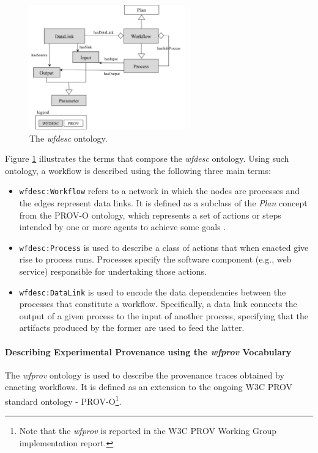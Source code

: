 \begin{figure}[ht]
  \centering
  \includegraphics[width=0.6\textwidth]{Figures/wfdesc.png}
  \caption{The \textit{wfdesc} ontology.}
  \label{fig:wfdesc}
\end{figure}

Figure \ref{fig:wfdesc} illustrates the terms that compose the \textit{wfdesc} ontology. Using such ontology, a workflow is described using the following three main terms:
\begin{itemize}
\item
\texttt{wfdesc:Workflow} refers to a network in which the nodes are processes and the edges represent data links. It is defined as a subclass of the \textit{Plan} concept from the PROV-O ontology, which represents a set of actions or steps intended by one or more agents to achieve some goals \cite{w3c-prov-o}. 
\item
\texttt{wfdesc:Process} is used to describe a class of actions that when enacted give rise to process runs. Processes specify the software component (e.g., web service) responsible for undertaking those actions.
\item
\texttt{wfdesc:DataLink} is used to encode the data dependencies between the processes that constitute a workflow. Specifically, a data link connects the output of a given process to the input of another process, specifying that the artifacts produced by the former are used to feed the latter.
\end{itemize}


\paragraph{Describing Experimental Provenance using the \textit{wfprov} Vocabulary}
The \textit{wfprov} ontology is used to describe the provenance traces obtained by enacting  workflows. It is defined as an extension to the ongoing W3C PROV standard ontology - PROV-O\footnote{Note that the \textit{wfprov} is reported in the W3C PROV Working Group implementation report.}.

